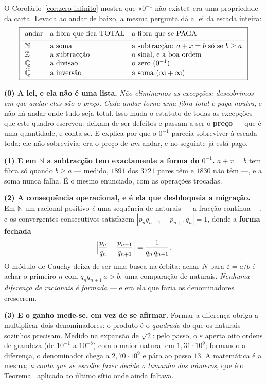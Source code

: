 \documentclass[livro.tex]{subfiles}
\begin{document}
\begin{teorema}\label{thm:fibra-por-andar}
O Corolário~\ref{cor:zero-infinito} mostra que «$0^{-1}$ não existe» era
uma propriedade da carta. Levada ao andar de baixo, a mesma pergunta dá a
lei da escada inteira:
\[
\boxed{
\begin{array}{lll}
\text{andar} & \text{a fibra que fica TOTAL} & \text{a fibra que se PAGA}\\
\midrule
\mathbb{N} & \text{a soma} & \text{a subtracção: } a+x=b \text{ só se } b\ge a\\
\mathbb{Z} & \text{a subtracção} & \text{o sinal, e a boa ordem}\\
\mathbb{Q} & \text{a divisão} & \text{o zero } (0^{-1})\\
\widehat{\mathbb{Q}} & \text{a inversão} & \text{a soma } (\infty+\infty)
\end{array}}
\]

\textbf{(0) A lei, e ela não é uma lista.} \emph{Não eliminamos as
excepções; descobrimos em que andar elas são o preço.} \emph{Cada andar torna uma
fibra total e paga noutra}, e não há andar onde tudo seja total. Isso
muda o estatuto de todas as excepções que este quadro escreveu: deixam de
ser defeitos e passam a ser o \textbf{preço} --- que é uma quantidade, e
conta-se. E explica por que o $0^{-1}$ parecia sobreviver à escada toda:
ele não sobrevivia; era o preço de \emph{um} andar, e no seguinte já está
pago.

\textbf{(1) E em $\mathbb{N}$ a subtracção tem exactamente a forma do
$0^{-1}$.} $a+x=b$ tem fibra só quando $b\ge a$ --- medido, $1891$ dos
$3721$ pares têm e $1830$ não têm ---, e a soma nunca falha. É o mesmo
enunciado, com as operações trocadas.

\textbf{(2) A consequência operacional, e é ela que desbloqueia a
migração.} Em $\mathbb{N}$ um racional positivo \emph{é} uma sequência de
naturais --- a fracção contínua ---, e os convergentes consecutivos
satisfazem $|p_nq_{n+1}-p_{n+1}q_n|=1$, donde a \textbf{forma fechada}
\[
\Bigl|\frac{p_n}{q_n}-\frac{p_{n+1}}{q_{n+1}}\Bigr|
=\frac{1}{q_n\,q_{n+1}} .
\]
O módulo de Cauchy deixa de ser uma busca na órbita: achar $N$ para
$\varepsilon=a/b$ é achar o primeiro $n$ com $q_n q_{n+1}\,a>b$, uma
comparação de naturais. \emph{Nenhuma diferença de racionais é formada} —
e era ela que fazia os denominadores crescerem.

\textbf{(3) E o ganho mede-se, em vez de se afirmar.} Formar a diferença
obriga a multiplicar dois denominadores: o produto é o \emph{quadrado} do
que os naturais sozinhos precisam. Medido na expansão de $\sqrt2$: pelo
passo, o $\varepsilon$ aperta oito ordens de grandeza (de $10^{-1}$ a
$10^{-8}$) com o maior natural em $1{,}31\cdot10^{9}$; formando a
diferença, o denominador chega a $2{,}70\cdot10^{9}$ e pára ao passo
$13$. A matemática é a mesma; \emph{a conta que se escolhe fazer decide o
tamanho dos números}, que é o Teorema~ aplicado ao
último sítio onde ainda faltava.


\end{teorema}
\end{document}
